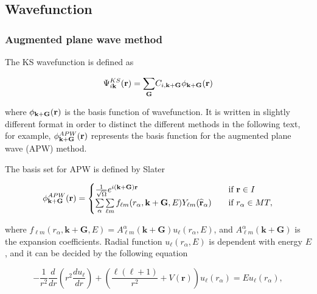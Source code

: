 \documentclass[a4paper, 12pt, titlepage,oneside,drop]{kthesis}
\begin{document}
\subsection{Wavefunction}
\subsubsection{Augmented plane wave method}

The KS wavefunction is defined as 

\begin{equation}\label{wavefunctions}
 \Psi^{KS}_{i\textbf{k}}(\textbf{r})=\sumg<\textbf{G}> C_{i,\textbf{k}+\textbf{G}}\phi_{\textbf {k}+\textbf{G}} ({\textbf r})
\end{equation}

where $\phi_{\textbf {k}+\textbf{G}} ({\textbf r})$ is the basis function of wavefunction. It is written in slightly different format in order to distinct the different methods in the following text, for example, 
$\phi^{APW}_{\textbf {k}+\textbf{G}}({\textbf r})$ represents the basis function for the augmented plane wave (APW) method.

The basis set for APW is defined by Slater

\begin{equation}\label{ap111}
\phi^{APW}_{\textbf {k}+\textbf{G}} ({\textbf r}) = 
\begin{cases} \frac {1}{\sqrt{\Omega}} e^{i({ \textbf {k}+\textbf{G}}) {\textbf r}} & \quad \mbox{if ${\textbf r} \in I $} 
\\
\sumg<\alpha>\sum\limits_{{\ell}m} f_{{\ell}{m}} (r_{\alpha},{\textbf {k}+\textbf{G}}, E) Y_{{\ell}m}(\widehat{{\textbf r}}_{\alpha})  & \quad \mbox{if $ r_{\alpha} \in MT, $}\\ 
\end{cases}
\end{equation}

where $f_{{\ell}{m}} (r_{\alpha},\textbf{k}+\textbf{G} ,E) =  A _{{\ell}m}^{\alpha} ( \textbf {k}+\textbf{G}) u_{{\ell}}(r_{\alpha}, E)$, and $A _{{\ell}m}^{\alpha} (\textbf {k}+\textbf{G}) $ is the expansion coefficients. 
Radial function $u_{{\ell}} (r_{\alpha}, E)$ is dependent with energy $E$, and it can be decided by the following equation

\begin{equation}\label{ap2}
-\frac{1}{r^2}  \frac{d}{dr} (r^2 \frac{du_{\ell}}{dr})+ \left(\frac{\ell(\ell+1)}{r^2}+V(\textbf{r})\right)u_{\ell}(r_{\alpha}) = E u_{\ell}(r_{\alpha}),
\end{equation}
\end{document}
